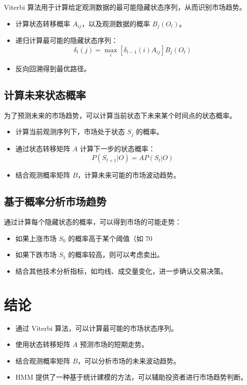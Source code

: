 \documentclass{article}
\begin{document}
Viterbi 算法用于计算给定观测数据的最可能隐藏状态序列，从而识别市场趋势。

\begin{itemize}
    \item 计算状态转移概率 $A_{ij}$，以及观测数据的概率 $B_j(O_t)$。
    \item 递归计算最可能的隐藏状态序列：
    \[
    \delta_t(j) = \max_i \left[ \delta_{t-1}(i) A_{ij} \right] B_j(O_t)
    \]
    \item 反向回溯得到最优路径。
\end{itemize}

\subsection{计算未来状态概率}

为了预测未来的市场趋势，可以计算当前状态下未来某个时间点的状态概率。

\begin{itemize}
    \item 计算当前观测序列下，市场处于状态 $S_j$ 的概率。
    \item 通过状态转移矩阵 $A$ 计算下一步的状态概率：
    \[
    P(S_{t+1} | O) = A P(S_t | O)
    \]
    \item 结合观测概率矩阵 $B$，计算未来可能的市场波动趋势。
\end{itemize}

\subsection{基于概率分析市场趋势}

通过计算每个隐藏状态的概率，可以得到市场的可能走势：

\begin{itemize}
    \item 如果上涨市场 $S_0$ 的概率高于某个阈值（如 70%
    \item 如果下跌市场 $S_1$ 的概率较高，则可以考虑卖出。
    \item 结合其他技术分析指标，如均线、成交量变化，进一步确认交易决策。
\end{itemize}

\section{结论}

\begin{itemize}
    \item 通过 Viterbi 算法，可以计算最可能的市场状态序列。
    \item 使用状态转移矩阵 $A$ 预测市场的短期走势。
    \item 结合观测概率矩阵 $B$，可以分析市场的未来波动趋势。
    \item HMM 提供了一种基于统计建模的方法，可以辅助投资者进行市场趋势判断。
\end{itemize}
\end{document}
